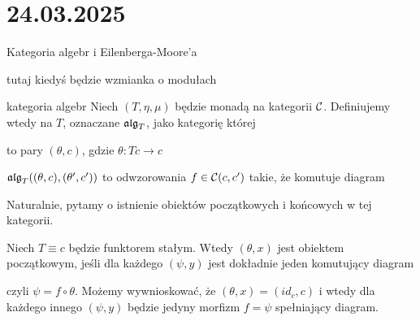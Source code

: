 \section{24.03.2025}{Kategoria algebr i Eilenberga-Moore'a}


{\color{red}tutaj kiedyś będzie wzmianka o modułach}


\begin{definition}{kategoria algebr}{}
  Niech $(T, \eta, \mu)$ będzie monadą na kategorii $\mathcal{C}$. Definiujemy wtedy  na $T$, oznaczane $\operatorname{\mathfrak{alg}}_T$, jako kategorię której
  \begin{description}[labelindent=5mm]
    \item[obiekty] to pary $(\theta, c)$, gdzie $\theta: Tc\to c$
    \item[morfizmy] $\operatorname{\mathfrak{alg}}_T((\theta, c), (\theta', c'))$ to odwzorowania $f\in \mathcal{C}(c, c')$ takie, że komutuje diagram
      \begin{center}
      \end{center}
  \end{description}
\end{definition}

Naturalnie, pytamy o istnienie obiektów początkowych i końcowych w tej kategorii.

\begin{example}
  Niech $T\equiv c$ będzie funktorem stałym. Wtedy $(\theta, x)$ jest obiektem początkowym, jeśli dla każdego $(\psi, y)$ jest dokładnie jeden komutujący diagram 
  \begin{center}
  \end{center}
  czyli $\psi=f\circ\theta$. Możemy wywnioskować, że $(\theta, x)=(id_c, c)$ i wtedy dla każdego innego $(\psi, y)$ będzie jedyny morfizm $f=\psi$ spełniający diagram.
\end{example}

